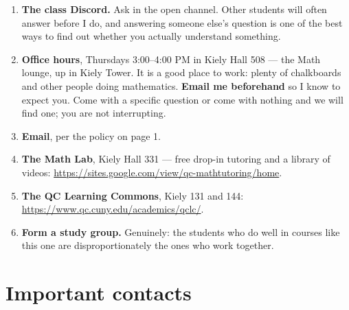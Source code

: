 \documentclass[11pt]{article}
\begin{document}
\begin{enumerate}
  \item \textbf{The class Discord.} Ask in the open channel. Other students will
        often answer before I do, and answering someone else's question is one
        of the best ways to find out whether you actually understand something.
  \item \textbf{Office hours}, Thursdays 3:00--4:00 PM in Kiely Hall 508 ---
        the Math lounge, up in Kiely Tower. It is a good place to work: plenty
        of chalkboards and other people doing mathematics. \textbf{Email me
        beforehand} so I know to expect you. Come with a specific question or
        come with nothing and we will find one; you are not interrupting.
  \item \textbf{Email}, per the policy on page 1.
  \item \textbf{The Math Lab}, Kiely Hall 331 --- free drop-in tutoring and a
        library of videos: \url{https://sites.google.com/view/qc-mathtutoring/home}.
  \item \textbf{The QC Learning Commons}, Kiely 131 and 144:
        \url{https://www.qc.cuny.edu/academics/qclc/}.
  \item \textbf{Form a study group.} Genuinely: the students who do well in
        courses like this one are disproportionately the ones who work
        together.
\end{enumerate}

\section{Important contacts}
\end{document}
